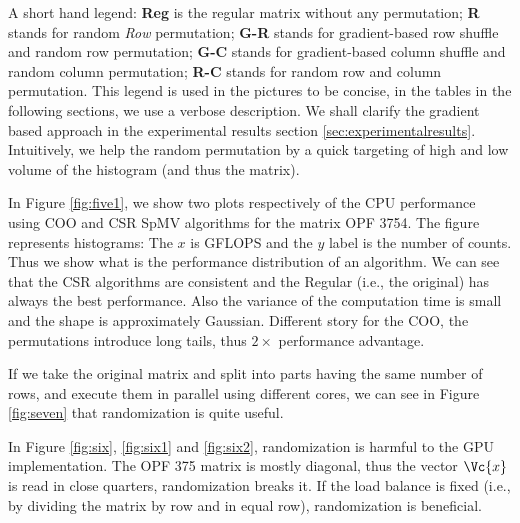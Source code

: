 \documentclass[acmsmall]{acmart}
\begin{document}
A short hand legend: {\bf Reg} is the regular matrix without any
permutation; {\bf R} stands for random {\em Row} permutation; {\bf
  G-R} stands for gradient-based row shuffle and random row
permutation; {\bf G-C} stands for gradient-based column shuffle and
random column permutation; {\bf R-C} stands for random row and column
permutation.  This legend is used in the pictures to be concise, in
the tables in the following sections, we use a verbose description. We
shall clarify the gradient based approach in the experimental results
section \ref{sec:experimentalresults}. Intuitively, we help the random
permutation by a quick targeting of high and low volume of the
histogram (and thus the matrix).


In Figure \ref{fig:five1}, we show two plots respectively of the CPU
performance using COO and CSR SpMV algorithms for the matrix OPF
3754. The figure represents histograms: The $x$ is GFLOPS and the $y$
label is the number of counts. Thus we show what is the performance
distribution of an algorithm.  We can see that the CSR algorithms are
consistent and the Regular (i.e., the original) has always the best
performance. Also the variance of the computation time is small and
the shape is approximately Gaussian.  Different story for the COO, the
permutations introduce long tails, thus $2\times$ performance
advantage.

If we take the original matrix and split into parts having the same
number of rows, and execute them in parallel using different cores, we
can see in Figure \ref{fig:seven} that randomization is quite useful.


In Figure \ref{fig:six}, \ref{fig:six1} and \ref{fig:six2},
randomization is harmful to the GPU implementation. The OPF 375 matrix
is mostly diagonal, thus the vector $\Vc{x}$ is read in close
quarters, randomization breaks it.  If the load balance is fixed
(i.e., by dividing the matrix by row and in equal row), randomization
is beneficial.

\end{document}
